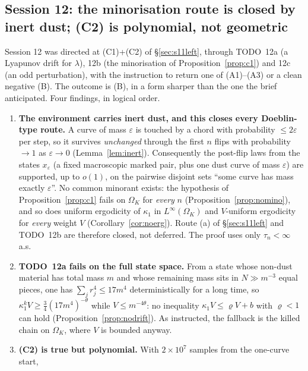 \subsection{Session 12: the minorisation route is closed by inert dust;
(C2) is polynomial, not geometric}\label{sec:s12}

Session 12 was directed at (C1)+(C2) of \S\ref{sec:s11left}, through
TODO~12a (a Lyapunov drift for $\lambda$), 12b (the minorisation of
Proposition~\ref{prop:c1}) and 12c (an odd perturbation), with the
instruction to return one of (A1)--(A3) or a clean negative (B).  The
outcome is (B), in a form sharper than the one the brief anticipated.
Four findings, in logical order.

\begin{enumerate}[leftmargin=2.2em]
\item[(1)] \textbf{The environment carries inert dust, and this closes
every Doeblin-type route.}  A curve of mass $\varepsilon$ is touched by
a chord with probability $\le2\varepsilon$ per step, so it survives
\emph{unchanged} through the first $n$ flips with probability
$\to1$ as $\varepsilon\to0$ (Lemma~\ref{lem:inert}).  Consequently the
post-flip laws from the states $x_\varepsilon$ (a fixed macroscopic
marked pair, plus one dust curve of mass $\varepsilon$) are supported,
up to $o(1)$, on the pairwise disjoint sets ``some curve has mass
exactly $\varepsilon$''.  No common minorant exists: the hypothesis of
Proposition~\ref{prop:c1} fails on $\Omega_K$ for \emph{every} $n$
(Proposition~\ref{prop:nomino}), and so does uniform ergodicity of
$\kappa_1$ in $L^\infty(\Omega_K)$ and $V$-uniform ergodicity for
\emph{every} weight $V$ (Corollary~\ref{cor:noerg}).  Route (a) of
\S\ref{sec:s11left} and TODO~12b are therefore closed, not
deferred.  The proof uses only $\tau_n<\infty$ a.s.
\item[(2)] \textbf{TODO~12a fails on the full state space.}  From a
state whose non-dust material has total mass $m$ and whose remaining
mass sits in $N\gg m^{-3}$ equal pieces, one has
$\sum_jr_j^4\le17m^4$ deterministically for a long time, so
$\kappa_1^kV\ge\tfrac34(17m^4)^{-\theta}$ while $V\le m^{-4\theta}$:
no inequality $\kappa_1V\le\varrho V+b$ with $\varrho<1$ can hold
(Proposition~\ref{prop:nodrift}).  As instructed, the fallback is the
killed chain on $\Omega_K$, where $V$ is bounded anyway.
\item[(3)] \textbf{(C2) is true but polynomial.}  With $2\times10^7$
samples from the one-curve start,

\end{enumerate}
